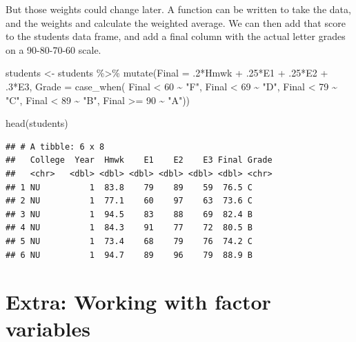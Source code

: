 \documentclass[
]{book}
\newenvironment{Shaded}{\begin{snugshade}}{\end{snugshade}}
\newcommand{\AttributeTok}[1]{\textcolor[rgb]{0.77,0.63,0.00}{#1}}
\newcommand{\DecValTok}[1]{\textcolor[rgb]{0.00,0.00,0.81}{#1}}
\newcommand{\FunctionTok}[1]{\textcolor[rgb]{0.00,0.00,0.00}{#1}}
\newcommand{\NormalTok}[1]{#1}
\newcommand{\OtherTok}[1]{\textcolor[rgb]{0.56,0.35,0.01}{#1}}
\newcommand{\SpecialCharTok}[1]{\textcolor[rgb]{0.00,0.00,0.00}{#1}}
\newcommand{\StringTok}[1]{\textcolor[rgb]{0.31,0.60,0.02}{#1}}
\begin{document}
But those weights could change later. A function can be written to take the data, and the weights and calculate the weighted average. We can then add that score to the students data frame, and add a final column with the actual letter grades on a 90-80-70-60 scale.

\begin{Shaded}
\begin{Highlighting}[]
\NormalTok{students }\OtherTok{\textless{}{-}}\NormalTok{ students }\SpecialCharTok{\%\textgreater{}\%} 
  \FunctionTok{mutate}\NormalTok{(}\AttributeTok{Final =}\NormalTok{ .}\DecValTok{2}\SpecialCharTok{*}\NormalTok{Hmwk }\SpecialCharTok{+}\NormalTok{ .}\DecValTok{25}\SpecialCharTok{*}\NormalTok{E1 }\SpecialCharTok{+}\NormalTok{ .}\DecValTok{25}\SpecialCharTok{*}\NormalTok{E2 }\SpecialCharTok{+}\NormalTok{ .}\DecValTok{3}\SpecialCharTok{*}\NormalTok{E3,}
         \AttributeTok{Grade =} \FunctionTok{case\_when}\NormalTok{(}
\NormalTok{           Final }\SpecialCharTok{\textless{}} \DecValTok{60} \SpecialCharTok{\textasciitilde{}} \StringTok{"F"}\NormalTok{,}
\NormalTok{           Final }\SpecialCharTok{\textless{}} \DecValTok{69} \SpecialCharTok{\textasciitilde{}} \StringTok{"D"}\NormalTok{,}
\NormalTok{           Final }\SpecialCharTok{\textless{}} \DecValTok{79} \SpecialCharTok{\textasciitilde{}} \StringTok{"C"}\NormalTok{,}
\NormalTok{           Final }\SpecialCharTok{\textless{}} \DecValTok{89} \SpecialCharTok{\textasciitilde{}} \StringTok{"B"}\NormalTok{,}
\NormalTok{           Final }\SpecialCharTok{\textgreater{}=} \DecValTok{90} \SpecialCharTok{\textasciitilde{}} \StringTok{"A"}\NormalTok{))}

\FunctionTok{head}\NormalTok{(students)}
\end{Highlighting}
\end{Shaded}

\begin{verbatim}
## # A tibble: 6 x 8
##   College  Year  Hmwk    E1    E2    E3 Final Grade
##   <chr>   <dbl> <dbl> <dbl> <dbl> <dbl> <dbl> <chr>
## 1 NU          1  83.8    79    89    59  76.5 C    
## 2 NU          1  77.1    60    97    63  73.6 C    
## 3 NU          1  94.5    83    88    69  82.4 B    
## 4 NU          1  84.3    91    77    72  80.5 B    
## 5 NU          1  73.4    68    79    76  74.2 C    
## 6 NU          1  94.7    89    96    79  88.9 B
\end{verbatim}

\hypertarget{extra-working-with-factor-variables}{%
\section{Extra: Working with factor variables}\label{extra-working-with-factor-variables}}
\end{document}
